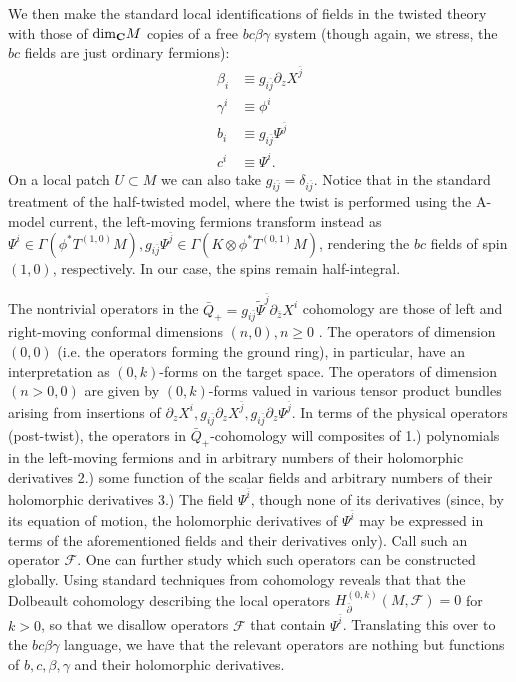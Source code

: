\documentclass[11pt]{amsart}
\newcommand\C{\mathbf{C}}
\theoremstyle{thm}
\numberwithin{equation}{subsection}
\theoremstyle{def}
\theoremstyle{rem}
\begin{document}
We then make the standard local identifications of fields in the twisted theory with those of ${\rm dim}_{\C}M$ copies of a free $bc\beta\gamma$ system (though again, we stress, the $bc$ fields are just ordinary fermions):
\begin{align*}
\beta_i &\equiv g_{i \bar{j}}\partial_z X^{\bar{j}} \\
\gamma^i &\equiv \phi^i \\
b_i &\equiv g_{i \bar{j}} \Psi^{\bar{j}} \\
c^i &\equiv \Psi^i.
\end{align*}
On a local patch $U \subset M$ we can also take $g_{i\bar{j}} = \delta_{i \bar{j}}$.
Notice that in the standard treatment of the half-twisted model, where the twist is performed using the A-model current, the left-moving fermions transform instead as $\Psi^i \in \Gamma(\phi^* T^{(1, 0)}M), g_{i \bar{j}}\Psi^{\bar{j}} \in \Gamma(K \otimes \phi^* T^{(0, 1)}M)$, rendering the $bc$ fields of spin $(1, 0)$, respectively. In our case, the spins remain half-integral.

The nontrivial operators in the $\bar{Q}_+ = g_{i \bar{j}}\tilde{\Psi}^{\bar{j}} \partial_{\bar{z}}X^i$ cohomology are those of left and right-moving conformal dimensions $(n, 0), n \geq 0$ \cite{Tan,CostelloHol,ESW}. 
The operators of dimension $(0, 0)$ (i.e. the operators forming the ground ring), in particular, have an interpretation as $(0,k)$-forms on the target space. 
The operators of dimension $(n > 0, 0)$ are given by $(0, k)$-forms valued in various tensor product bundles arising from insertions of $\partial_z X^i, g_{i \bar{j}}\partial_z X^{\bar{j}}, g_{i \bar{j}}\partial_z \Psi^{\bar{j}}$. In terms of the physical operators (post-twist), the operators in $\bar{Q}_+$-cohomology will composites of 1.) polynomials in the left-moving fermions and in arbitrary numbers of their holomorphic derivatives 2.) some function of the scalar fields and arbitrary numbers of their holomorphic derivatives 3.) The field $\Psi^{\bar{i}}$, though none of its derivatives (since, by its equation of motion, the holomorphic derivatives of $\Psi^{\bar{i}}$ may be expressed in terms of the aforementioned fields and their derivatives only). Call such an operator $\mathcal{F}$. One can further study which such operators can be constructed globally. Using standard techniques from cohomology reveals that that the Dolbeault cohomology describing the local operators $H_{\bar{\partial}}^{(0,k)}(M, \mathcal{F})=0$ for $k>0$, so that we disallow operators $\mathcal{F}$ that contain $\Psi^{\bar{i}}$. Translating this over to the $bc\beta\gamma$ language, we have that the relevant operators are nothing but functions of $b, c, \beta, \gamma$ and their holomorphic derivatives.
\end{document}
